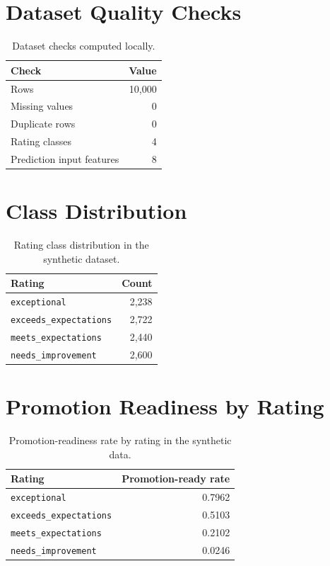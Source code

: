 \section{Dataset Quality Checks}
\begin{table}[H]\centering\small
\caption{Dataset checks computed locally.}
\label{tab:ai-quality-checks}
\begin{tabular}{lr}
\toprule
Check & Value\\
\midrule
Rows & 10,000\\
Missing values & 0\\
Duplicate rows & 0\\
Rating classes & 4\\
Prediction input features & 8\\
\bottomrule
\end{tabular}
\end{table}

\section{Class Distribution}
\begin{table}[H]\centering\small
\caption{Rating class distribution in the synthetic dataset.}
\label{tab:ai-class-distribution}
\begin{tabular}{lr}
\toprule
Rating & Count\\
\midrule
\texttt{exceptional} & 2,238\\
\texttt{exceeds\_expectations} & 2,722\\
\texttt{meets\_expectations} & 2,440\\
\texttt{needs\_improvement} & 2,600\\
\bottomrule
\end{tabular}
\end{table}

\section{Promotion Readiness by Rating}
\begin{table}[H]\centering\small
\caption{Promotion-readiness rate by rating in the synthetic data.}
\label{tab:promotion-rate}
\begin{tabular}{lr}
\toprule
Rating & Promotion-ready rate\\
\midrule
\texttt{exceptional} & 0.7962\\
\texttt{exceeds\_expectations} & 0.5103\\
\texttt{meets\_expectations} & 0.2102\\
\texttt{needs\_improvement} & 0.0246\\
\bottomrule
\end{tabular}
\end{table}

